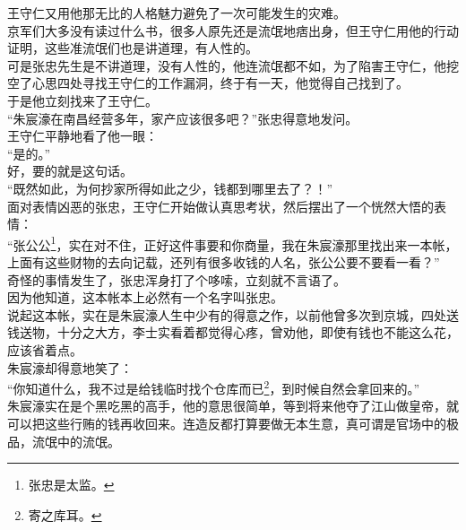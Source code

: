 \begin{multicols}{\theparacolNo}
王守仁又用他那无比的人格魅力避免了一次可能发生的灾难。\\

京军们大多没有读过什么书，很多人原先还是流氓地痞出身，但王守仁用他的行动证明，这些准流氓们也是讲道理，有人性的。\\

可是张忠先生是不讲道理，没有人性的，他连流氓都不如，为了陷害王守仁，他挖空了心思四处寻找王守仁的工作漏洞，终于有一天，他觉得自己找到了。\\

于是他立刻找来了王守仁。\\

“朱宸濠在南昌经营多年，家产应该很多吧？”张忠得意地发问。\\

王守仁平静地看了他一眼：\\

“是的。”\\

好，要的就是这句话。\\

“既然如此，为何抄家所得如此之少，钱都到哪里去了？！”\\

面对表情凶恶的张忠，王守仁开始做认真思考状，然后摆出了一个恍然大悟的表情：\\

“张公公\footnote{张忠是太监。}，实在对不住，正好这件事要和你商量，我在朱宸濠那里找出来一本帐，上面有这些财物的去向记载，还列有很多收钱的人名，张公公要不要看一看？”\\

奇怪的事情发生了，张忠浑身打了个哆嗦，立刻就不言语了。\\

因为他知道，这本帐本上必然有一个名字叫张忠。\\

说起这本帐，实在是朱宸濠人生中少有的得意之作，以前他曾多次到京城，四处送钱送物，十分之大方，李士实看着都觉得心疼，曾劝他，即使有钱也不能这么花，应该省着点。\\

朱宸濠却得意地笑了：\\

“你知道什么，我不过是给钱临时找个仓库而已\footnote{寄之库耳。}，到时候自然会拿回来的。”\\

朱宸濠实在是个黑吃黑的高手，他的意思很简单，等到将来他夺了江山做皇帝，就可以把这些行贿的钱再收回来。连造反都打算要做无本生意，真可谓是官场中的极品，流氓中的流氓。\\


\end{multicols}
